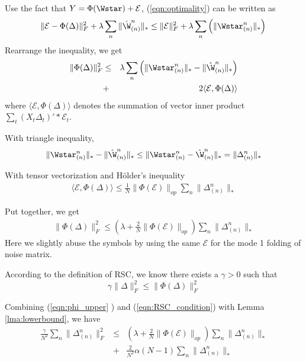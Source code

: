 Use the fact that $Y = \Phi(\Wstar)+\mathcal{E}$, (\ref{eqn:optimality}) can be written as
\begin{equation}
\|\mathcal{E} - \Phi(\Delta) \|_F^2  + \lambda \sum_n \|\hat{\W}^n_{(n)} \|_* \leq  \|\mathcal{E}\|_F^2\\
+ \lambda \sum_n \left( \| \Wstar^{n}_{(n)}\|_{*} \right)\nonumber \\
\end{equation}
Rearrange the inequality, we get 
\begin{eqnarray*}
\|\Phi(\Delta)\|_F^2 &\leq & \lambda \sum_n \left( \|  \Wstar^n_{(n)}\|_{*}- \|\hat{\W}^n_{(n)} \|_* \right)\nonumber \\
& +& 2\langle\mathcal{E}, \Phi(\Delta) \rangle
\end{eqnarray*}
where $\langle\mathcal{E}, \Phi(\Delta)\rangle$ denotes the summation of vector inner product $\sum_{t} (X_t\Delta_t)'*\mathcal{E}_t $.

With triangle inequality,
\begin{equation}
\|  \Wstar^n_{(n)} \|_*- \|\hat{\W}^n_{(n)} \|_* \leq \| \Wstar^n_{(n)}  - \hat{\W}^n_{(n)} \|_*=\|\Delta^n_{(n)}\|_{*}
\end{equation}

With tensor vectorization and H{\"o}lder's inequality 
\begin{eqnarray}
\langle \mathcal{E}, \Phi(\Delta) \rangle \leq \frac{1}{N}\|\Phi(\mathcal{E})\|_{op} \sum_n  \|\Delta^n_{(n)}\|_*
\end{eqnarray}


Put together, we get
\begin{eqnarray}\label{eqn:phi_upper}
\|\Phi(\Delta)\|_F^2  \leq (\lambda +\frac{2}{N}\|\Phi(\mathcal{E})\|_{op}) \sum_n  \|\Delta^n_{(n)}\|_*
\end{eqnarray}
Here we slightly abuse the symbols by using the same $\mathcal{E}$ for the mode 1 folding of noise matrix.

According to the definition of RSC, we know there exists a $\gamma >0$ such that
\begin{equation}\label{eqn:RSC_condition}
\gamma\|\Delta\|_F^2  \leq \|\Phi(\Delta)\|_F^2
\end{equation}

Combining (\ref{eqn:phi_upper} ) and (\ref{eqn:RSC_condition}) with Lemma \ref{lma:lowerbound}, we have
\begin{eqnarray*}
\frac{\gamma}{N^2}\sum_n \|\Delta^{n}_{(n)} \|_F^2  & \leq  &(\lambda +\frac{2}{N}\|\Phi(\mathcal{E})\|_{op}) \sum_n  \|\Delta^n_{(n)}\|_*\\ &+&\frac{2}{N^2} \alpha (N-1)\sum_n \|\Delta_{(n)}^n\|_*
\end{eqnarray*}


